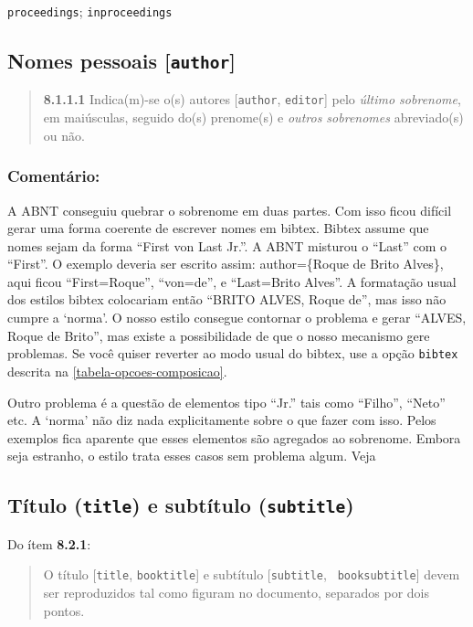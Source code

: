 \documentclass[a4paper]{ltxdoc}
\begin{document}
{\tt proceedings}\cite{7.5.1.2-1,7.5.1.2-2,7.5.1.2-3,7.5.3-1,8.1.2.1-3};
{\tt inproceedings}\cite{7.5.2.2-1,7.5.2.2-2,7.5.2.2-3,7.5.3-2,7.5.3-3,7.5.3-4,7.5.3-5}

\subsection{Nomes pessoais [{\tt author}]}

\label{nome-pessoais}
\begin{quote}
{\bf 8.1.1.1}\cite{NBR6023:2000}
Indica(m)-se o(s) autores [{\tt author}, {\tt editor}]
pelo \emph{último sobrenome}, em maiúsculas, seguido
do(s) prenome(s) e \emph{outros sobrenomes} abreviado(s) ou não.
\cite{8.1.1.1-1,8.1.1.1-2}
\cite{8.1.1.1-1,8.1.1.1-2,8.1.1.1-3}
\end{quote}

\subsubsection{Comentário:}
A ABNT conseguiu quebrar o sobrenome em duas partes. Com isso ficou difícil
gerar uma forma coerente de escrever nomes em \textsf{bibtex}.
\textsf{Bibtex} assume que nomes sejam da forma ``First von Last Jr.''. A ABNT
misturou o ``Last'' com o ``First''. O exemplo  deveria
ser escrito assim: author=\{Roque de Brito Alves\}, aqui ficou ``First=Roque'',
``von=de'',  e ``Last=Brito Alves''. A formatação usual dos estilos
\textsf{bibtex} colocariam então ``BRITO ALVES, Roque de'',  mas isso não cumpre
a `norma'. O nosso estilo consegue contornar o problema e gerar ``ALVES, Roque de
Brito'', mas existe a possibilidade de que o nosso mecanismo gere problemas.
Se você quiser reverter ao modo usual do \textsf{bibtex}, use a opção
{\tt bibtex} descrita na \autoref{tabela-opcoes-composicao}. 

Outro problema é a questão de elementos tipo ``Jr.'' tais como ``Filho'',
``Neto'' etc. A `norma' não diz nada explicitamente sobre o que fazer com isso.
Pelos exemplos fica aparente que esses elementos são agregados ao sobrenome.
Embora seja estranho, o estilo trata esses casos sem problema algum.
Veja 

\subsection{Título ({\tt title}) e subtítulo ({\tt subtitle})}

Do ítem {\bf 8.2.1}\cite{NBR6023:2000}:
\begin{quote}
O título [{\tt title}, {\tt booktitle}] e subtítulo [{\tt subtitle}, {\tt
booksubtitle}] devem ser reproduzidos tal como figuram no documento, separados
por dois pontos.
\end{quote}
\end{document}
